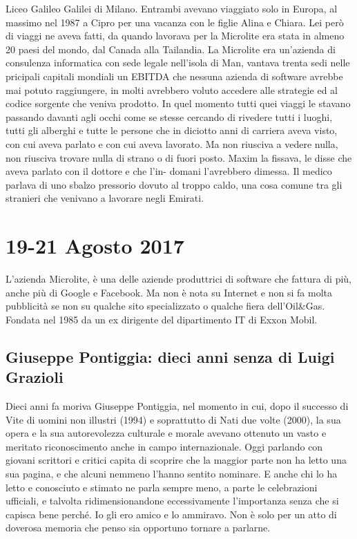 Liceo Galileo Galilei di Milano. Entrambi avevano viaggiato solo in Europa, al massimo nel 1987 a
Cipro per una vacanza con le figlie Alina e Chiara.
Lei però di viaggi ne aveva fatti, da quando lavorava per la Microlite era stata in almeno 20 paesi del
mondo, dal Canada alla Tailandia. La Microlite era un'azienda di consulenza informatica con sede
legale nell'isola di Man, vantava trenta sedi nelle pricipali capitali mondiali un EBITDA che nessuna
azienda di software avrebbe mai potuto raggiungere, in molti avrebbero voluto accedere alle strategie
ed al codice sorgente che veniva prodotto.
In quel momento tutti quei viaggi le stavano passando davanti agli occhi come se stesse cercando di
rivedere tutti i luoghi, tutti gli alberghi e tutte le persone che in diciotto anni di carriera aveva visto,
con cui aveva parlato e con cui aveva lavorato. Ma non riusciva a vedere nulla, non riusciva trovare
nulla di strano o di fuori posto. Maxim la fissava, le disse che aveva parlato con il dottore e che l'in-
domani l'avrebbero dimessa. Il medico parlava di uno sbalzo pressorio dovuto al troppo caldo, una cosa
comune tra gli stranieri che venivano a lavorare negli Emirati.
\section{19-21 Agosto 2017}
L'azienda Microlite, è una delle aziende produttrici di software che fattura di più, anche più di Google e Facebook. Ma non è nota su Internet e non si fa molta pubblicità se non su qualche sito specializzato o qualche fiera dell'Oil\&Gas.\newline
Fondata nel 1985 da un ex dirigente del dipartimento IT di Exxon Mobil.\newline
\subsection{Giuseppe Pontiggia: dieci anni senza di Luigi Grazioli}
Dieci anni fa moriva Giuseppe Pontiggia, nel momento in cui, dopo il successo di Vite di uomini non illustri (1994) e soprattutto di Nati due volte (2000), la sua opera e la sua autorevolezza culturale e morale avevano ottenuto un vasto e meritato riconoscimento anche in campo internazionale. Oggi parlando con giovani scrittori e critici capita di scoprire che la maggior parte non ha letto una sua pagina, e che alcuni nemmeno l’hanno sentito nominare. E anche chi lo ha letto e conosciuto e stimato ne parla sempre meno, a parte le celebrazioni ufficiali, e talvolta ridimensionandone eccessivamente l’importanza senza che si capisca bene perché. Io gli ero amico e lo ammiravo. Non è solo per un atto di doverosa memoria che penso sia opportuno tornare a parlarne.\newline

